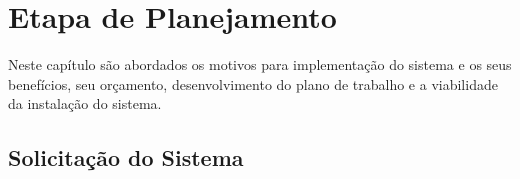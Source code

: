 
\chapter{Etapa de Planejamento}


Neste capítulo são abordados os motivos para implementação do sistema e os seus benefícios, seu orçamento, desenvolvimento do plano de trabalho e a viabilidade da instalação do sistema.


\section{Solicita\c{c}\~{a}o do Sistema}

